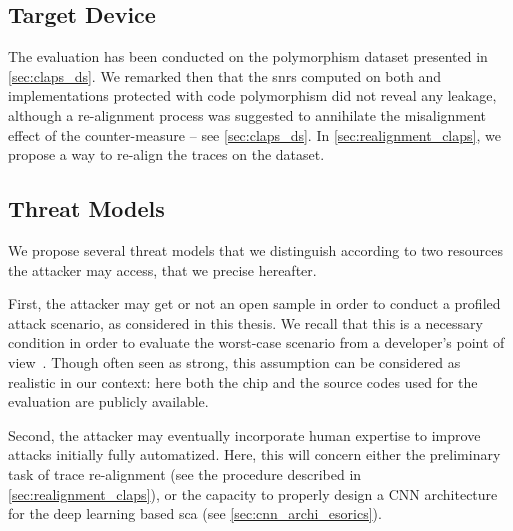 \subsection{Target Device}
The evaluation has been conducted on the polymorphism dataset presented in \autoref{sec:claps_ds}.
We remarked then that the \glspl{snr} computed on both \mbedTLS{} and \aeshuitbit{} implementations protected with code polymorphism did not reveal any leakage, although a re-alignment process was suggested to annihilate the misalignment effect of the counter-measure -- see \autoref{sec:claps_ds}.
In \autoref{sec:realignment_claps}, we propose a way to re-align the traces on the \mbedTLS{} dataset.


\subsection{Threat Models}
\label{sec:threat_models}
We propose several threat models that we distinguish according to two resources the attacker may access, that we precise hereafter.

First, the attacker may get or not an open sample in order to conduct a profiled attack scenario, as considered in this thesis.
We recall that this is a necessary condition in order to evaluate the worst-case scenario from a developer's point of view~\cite{heuser_good_2014}.
Though often seen as strong, this assumption can be considered as realistic in our context: here both the chip and the source codes used for the evaluation are publicly available.

Second, the attacker may eventually incorporate human expertise to improve attacks initially fully automatized.
Here, this will concern either the preliminary task of trace re-alignment (see the procedure described in \autoref{sec:realignment_claps}), or the capacity to  properly design a CNN architecture for the deep learning based \gls{sca} (see \autoref{sec:cnn_archi_esorics}).

